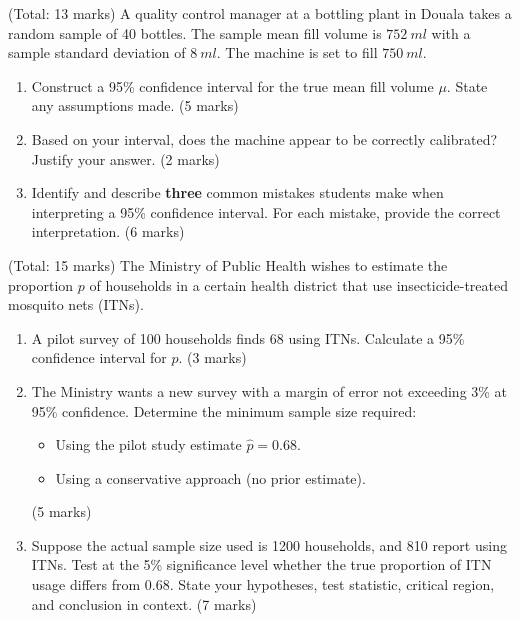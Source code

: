 \documentclass[11pt]{article}
\begin{document}
\begin{exercice} \hfill (Total: 13 marks)
A quality control manager at a bottling plant in Douala takes a random sample of 40 bottles. The sample mean fill volume is $\SI{752}{ml}$ with a sample standard deviation of $\SI{8}{ml}$. The machine is set to fill $\SI{750}{ml}$.
\begin{enumerate}
\item Construct a 95\% confidence interval for the true mean fill volume $\mu$. State any assumptions made. \hfill (5 marks)
\item Based on your interval, does the machine appear to be correctly calibrated? Justify your answer. \hfill (2 marks)
\item Identify and describe \textbf{three} common mistakes students make when interpreting a 95\% confidence interval. For each mistake, provide the correct interpretation. \hfill (6 marks)
\end{enumerate}
\end{exercice}

\begin{exercice} \hfill (Total: 15 marks)
The Ministry of Public Health wishes to estimate the proportion $p$ of households in a certain health district that use insecticide-treated mosquito nets (ITNs).
\begin{enumerate}
\item A pilot survey of 100 households finds 68 using ITNs. Calculate a 95\% confidence interval for $p$. \hfill (3 marks)
\item The Ministry wants a new survey with a margin of error not exceeding 3\% at 95\% confidence. Determine the minimum sample size required:
      \begin{itemize}
      \item[a)] Using the pilot study estimate $\hat{p} = 0.68$.
      \item[b)] Using a conservative approach (no prior estimate).
      \end{itemize}
      \hfill (5 marks)
\item Suppose the actual sample size used is 1200 households, and 810 report using ITNs. Test at the 5\% significance level whether the true proportion of ITN usage differs from 0.68. State your hypotheses, test statistic, critical region, and conclusion in context. \hfill (7 marks)
\end{enumerate}
\end{exercice}
\end{document}
